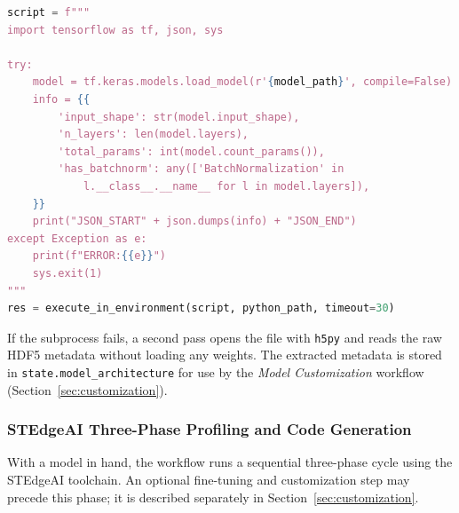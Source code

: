 \begin{lstlisting}[language=python, caption={Inline subprocess script for model inspection}, label={lst:legacy_env}]
script = f"""
import tensorflow as tf, json, sys

try:
    model = tf.keras.models.load_model(r'{model_path}', compile=False)
    info = {{
        'input_shape': str(model.input_shape),
        'n_layers': len(model.layers),
        'total_params': int(model.count_params()),
        'has_batchnorm': any(['BatchNormalization' in
            l.__class__.__name__ for l in model.layers]),
    }}
    print("JSON_START" + json.dumps(info) + "JSON_END")
except Exception as e:
    print(f"ERROR:{{e}}")
    sys.exit(1)
"""
res = execute_in_environment(script, python_path, timeout=30)
\end{lstlisting}

If the subprocess fails, a second pass opens the file with \texttt{h5py} and reads the raw HDF5 metadata without loading any weights. The extracted metadata is stored in \texttt{state.model\_architecture} for use by the \textit{Model Customization} workflow (Section~\ref{sec:customization}).

\subsubsection{STEdgeAI Three-Phase Profiling and Code Generation}

With a model in hand, the workflow runs a sequential three-phase cycle using the STEdgeAI toolchain. An optional fine-tuning and customization step may precede this phase; it is described separately in Section~\ref{sec:customization}.

